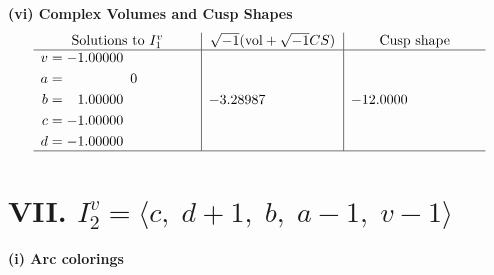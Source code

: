 \documentclass[1p]{elsarticle_modified}
\theoremstyle{definition}
\newcommand{\I}{\sqrt{-1}}
\begin{document}
\newpage\flushleft \textbf{(vi) Complex Volumes and Cusp Shapes}
$$\begin{array}{c|c|c}  
\text{Solutions to }I^v_{1}& \I (\text{vol} + \sqrt{-1}CS) & \text{Cusp shape}\\
 \hline 
\begin{aligned}
v &= -1.00000\phantom{ +0.000000I} \\
a &= \phantom{-0.000000 } 0 \\
b &= \phantom{-}1.00000\phantom{ +0.000000I} \\
c &= -1.00000\phantom{ +0.000000I} \\
d &= -1.00000\phantom{ +0.000000I}\end{aligned}
 & -3.28987\phantom{ +0.000000I} & -12.0000\phantom{ +0.000000I}\\
 \hline 
 \end{array}$$\newpage\newpage\renewcommand{\arraystretch}{1}
\centering \section*{VII. $I^v_{2}= \langle c,\;d+1,\;b,\;a-1,\;v-1 \rangle$}
\flushleft \textbf{(i) Arc colorings}\\
\end{document}
